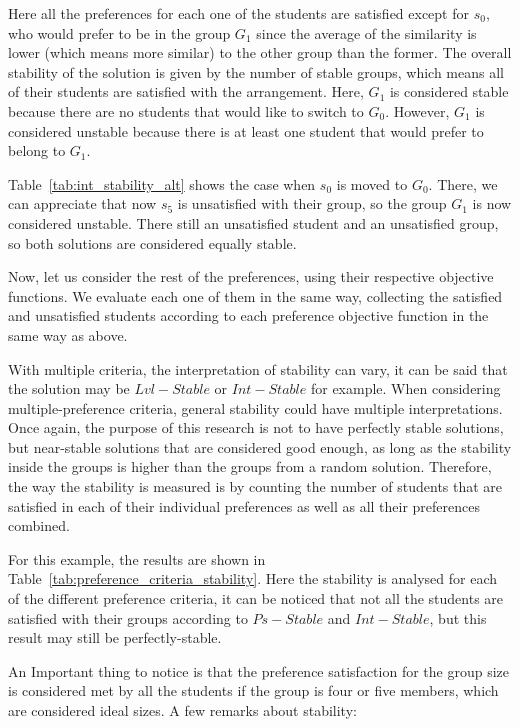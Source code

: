 Here all the preferences for each one of the students are satisfied except for $s_0$, who would prefer to be in the group $G_1$ since the average of the similarity is lower (which means more similar) to the other group than the former. The overall stability of the solution is given by the number of stable groups, which means all of their students are satisfied with the arrangement. Here, $G_1$ is considered stable because there are no students that would like to switch to $G_0$. However, $G_1$ is considered unstable because there is at least one student that would prefer to belong to $G_1$.\

Table~\ref{tab:int_stability_alt} shows the case when $s_0$ is moved to $G_0$. There, we can appreciate that now $s_5$ is unsatisfied with their group, so the group $G_1$ is now considered unstable. There still an unsatisfied student and an unsatisfied group, so both solutions are considered equally stable.\

Now, let us consider the rest of the preferences, using their respective objective functions. We evaluate each one of them in the same way, collecting the satisfied and unsatisfied students according to each preference objective function in the same way as above.\

With multiple criteria, the interpretation of stability can vary, it can be said that the solution may be $Lvl-Stable$ or $Int-Stable$ for example. When considering multiple-preference criteria, general stability could have multiple interpretations. Once again, the purpose of this research is not to have perfectly stable solutions, but near-stable solutions that are considered good enough, as long as the stability inside the groups is higher than the groups from a random solution. Therefore, the way the stability is measured is by counting the number of students that are satisfied in each of their individual preferences as well as all their preferences combined.\

For this example, the results are shown in Table~\ref{tab:preference_criteria_stability}. Here the stability is analysed for each of the different preference criteria, it can be noticed that not all the students are satisfied with their groups according to $Ps-Stable$ and $Int-Stable$, but this result may still be perfectly-stable.\

An Important thing to notice is that the preference satisfaction for the group size is considered met by all the students if the group is four or five members, which are considered ideal sizes. A few remarks about stability:

